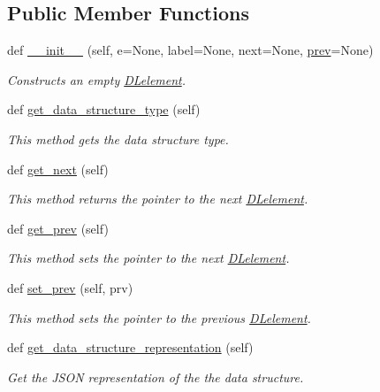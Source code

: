 \subsection*{Public Member Functions}
\begin{DoxyCompactItemize}
\item 
def \mbox{\hyperlink{class_bridges_1_1dl__element_1_1_d_lelement_a53233b54dce75c96438912fba591217a}{\+\_\+\+\_\+init\+\_\+\+\_\+}} (self, e=None, label=None, next=None, \mbox{\hyperlink{class_bridges_1_1dl__element_1_1_d_lelement_a5098c0244f6c4512db45f494266baf8a}{prev}}=None)
\begin{DoxyCompactList}\small\item\em Constructs an empty \mbox{\hyperlink{class_bridges_1_1dl__element_1_1_d_lelement}{D\+Lelement}}. \end{DoxyCompactList}\item 
def \mbox{\hyperlink{class_bridges_1_1dl__element_1_1_d_lelement_a8e58440740696b00b0fbf466311a2e82}{get\+\_\+data\+\_\+structure\+\_\+type}} (self)
\begin{DoxyCompactList}\small\item\em This method gets the data structure type. \end{DoxyCompactList}\item 
def \mbox{\hyperlink{class_bridges_1_1dl__element_1_1_d_lelement_a494dbc772c5be2fedc1543c33ff18773}{get\+\_\+next}} (self)
\begin{DoxyCompactList}\small\item\em This method returns the pointer to the next \mbox{\hyperlink{class_bridges_1_1dl__element_1_1_d_lelement}{D\+Lelement}}. \end{DoxyCompactList}\item 
def \mbox{\hyperlink{class_bridges_1_1dl__element_1_1_d_lelement_ab3a51eae57870b6b45b09b8810d9b22b}{get\+\_\+prev}} (self)
\begin{DoxyCompactList}\small\item\em This method sets the pointer to the next \mbox{\hyperlink{class_bridges_1_1dl__element_1_1_d_lelement}{D\+Lelement}}. \end{DoxyCompactList}\item 
def \mbox{\hyperlink{class_bridges_1_1dl__element_1_1_d_lelement_a5a1281ba8e5d39551f6b0628b28cdda2}{set\+\_\+prev}} (self, prv)
\begin{DoxyCompactList}\small\item\em This method sets the pointer to the previous \mbox{\hyperlink{class_bridges_1_1dl__element_1_1_d_lelement}{D\+Lelement}}. \end{DoxyCompactList}\item 
def \mbox{\hyperlink{class_bridges_1_1dl__element_1_1_d_lelement_ab2019529a20633a852a06221b11776c9}{get\+\_\+data\+\_\+structure\+\_\+representation}} (self)
\begin{DoxyCompactList}\small\item\em Get the J\+S\+ON representation of the the data structure. \end{DoxyCompactList}\end{DoxyCompactItemize}
